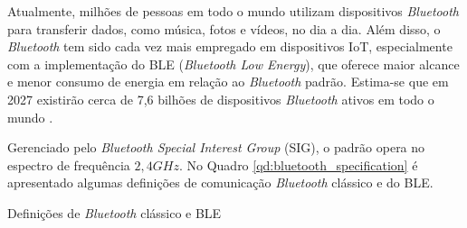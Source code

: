 Atualmente, milhões de pessoas em todo o mundo utilizam dispositivos \textit{Bluetooth} para transferir dados, como música, fotos e vídeos, no dia a dia. Além disso, o \textit{Bluetooth} tem sido cada vez mais empregado em dispositivos IoT, especialmente com a implementação do BLE (\textit{Bluetooth Low Energy}), que oferece maior alcance e menor consumo de energia em relação ao \textit{Bluetooth} padrão. Estima-se que em 2027 existirão cerca de 7,6 bilhões de dispositivos \textit{Bluetooth} ativos em todo o mundo \cite{BluetoothSite}.


Gerenciado pelo \textit{Bluetooth Special Interest Group} (SIG), o padrão opera no espectro de frequência $2,4GHz$. No Quadro \ref{qd:bluetooth_specification} é apresentado algumas definições de comunicação \textit{Bluetooth} clássico e do BLE.

\begin{quadro}[htb]
	\caption{Definições de \textit{Bluetooth} clássico e BLE}
	
	\label{qd:bluetooth_specification}
\end{quadro}


